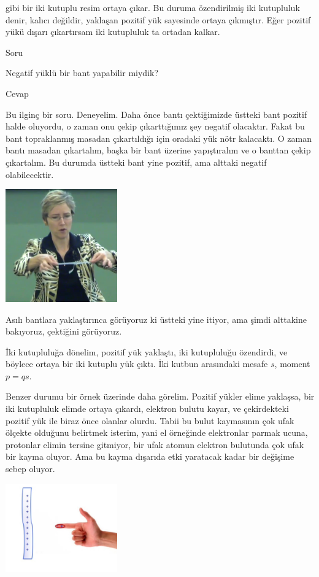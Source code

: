 \documentclass[12pt,fleqn]{article}\usepackage{../../common}
\begin{document}
gibi bir iki kutuplu resim ortaya çıkar. Bu duruma özendirilmiş iki kutupluluk
denir, kalıcı değildir, yaklaşan pozitif yük sayesinde ortaya çıkmıştır. Eğer
pozitif yükü dışarı çıkartırsam iki kutupluluk ta ortadan kalkar. 

Soru

Negatif yüklü bir bant yapabilir miydik?

Cevap

Bu ilginç bir soru. Deneyelim. Daha önce bantı çektiğimizde üstteki bant pozitif
halde oluyordu, o zaman onu çekip çıkarttığımız şey negatif olacaktır. Fakat bu
bant topraklanmış masadan çıkartıldığı için oradaki yük nötr kalacaktı. O zaman
bantı masadan çıkartalım, başka bir bant üzerine yapıştıralım ve o banttan çekip
çıkartalım. Bu durumda üstteki bant yine pozitif, ama alttaki negatif
olabilecektir. 

\includegraphics[width=13em]{03_12.png}

Asılı bantlara yaklaştırınca görüyoruz ki üstteki yine itiyor, ama şimdi
alttakine bakıyoruz, çektiğini görüyoruz.

İki kutupluluğa dönelim, pozitif yük yaklaştı, iki kutupluluğu özendirdi, ve
böylece ortaya bir iki kutuplu yük çıktı. İki kutbun arasındaki mesafe $s$,
moment $p = qs$.

Benzer durumu bir örnek üzerinde daha görelim. Pozitif yükler elime yaklaşsa,
bir iki kutupluluk elimde ortaya çıkardı, elektron bulutu kayar, ve çekirdekteki
pozitif yük ile biraz önce olanlar olurdu. Tabii bu bulut kaymasının çok ufak
ölçekte olduğunu belirtmek isterim, yani el örneğinde elektronlar parmak ucuna,
protonlar elimin tersine gitmiyor, bir ufak atomun elektron bulutunda çok ufak
bir kayma oluyor. Ama bu kayma dışarıda etki yaratacak kadar bir değişime sebep
oluyor. 

\includegraphics[width=13em]{03_13.png}
\end{document}
